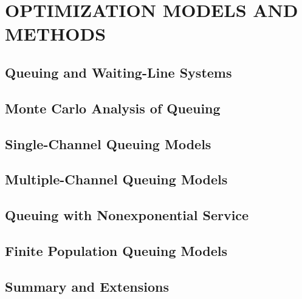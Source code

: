\chapter{OPTIMIZATION MODELS AND METHODS}\label{chap:13}

\section{Queuing and Waiting-Line Systems}


\section{Monte Carlo Analysis of Queuing}


\section{Single-Channel Queuing Models}


\section{Multiple-Channel Queuing Models}


\section{Queuing with Nonexponential Service}


\section{Finite Population Queuing Models}


\section{Summary and Extensions}


\begin{exercises}
    \begin{exercise}
    \label{sea-13-1}
    
    \end{exercise}
    \begin{solution}
    \end{solution}

\end{exercises}